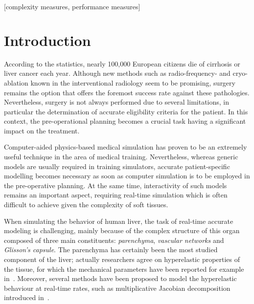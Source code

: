 \documentclass{acm_proc_article-sp}
\begin{document}
[complexity measures, performance measures]



\section{Introduction} %

According to the statistics, nearly 100,000 European citizens die of cirrhosis or liver cancer each year. 
Although new methods such as radio-frequency- and cryo-ablation known in the interventional radiology 
seem to be promising, surgery remains the option that offers the foremost success rate against these pathologies. 
Nevertheless, surgery is not always performed due to several limitations, in particular the determination 
of accurate eligibility criteria for the patient. 
In this context, the pre-operational planning becomes a crucial task having a significant impact on the treatment. 

Computer-aided physics-based medical simulation has proven to be an extremely useful technique in the area of medical training. 
Nevertheless, whereas generic models are usually required in training simulators, accurate patient-specific modelling
becomes necessary as soon as computer simulation is to be employed in the pre-operative planning. At the same time, 
interactivity of such models remains an important aspect, requiring real-time simulation which is often difficult to 
achieve given the complexity of soft tissues. 

When simulating the behavior of human liver, the task of real-time accurate modeling is challenging, mainly because of the complex structure 
of this organ composed of three main constituents: \emph{parenchyma}, \emph{vascular networks} and \emph{Glisson's capsule}.
The parenchyma has certainly been the most studied component of the liver; actually researchers agree on hyperelastic 
properties of the tissue, for which the mechanical parameters have been reported for example in~\cite{Kerdok2006,Gao2009}. 
Moreover, several methods have been proposed to model the hyperelastic behaviour at real-time rates, such as multiplicative Jacobian decomposition
introduced in~\cite{Marchesseau2010}.
\end{document}
